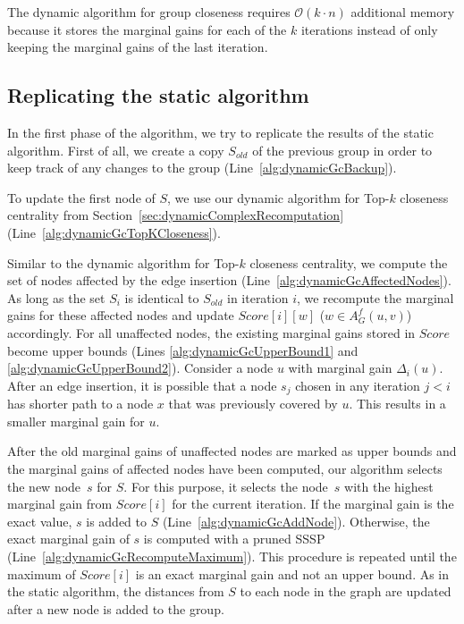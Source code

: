 The dynamic algorithm for group closeness requires $\mathcal{O}(k \cdot n)$ additional memory because it stores the marginal gains for each of the $k$ iterations instead of only keeping the marginal gains of the last iteration.

\subsection{Replicating the static algorithm}
In the first phase of the algorithm, we try to replicate the results of the static algorithm. First of all, we create a copy $S_{old}$ of the previous group in order to keep track of any changes to the group (Line~\ref{alg:dynamicGcBackup}).

To update the first node of $S$, we use our dynamic algorithm for Top-$k$ closeness centrality from Section~\ref{sec:dynamicComplexRecomputation} (Line~\ref{alg:dynamicGcTopKCloseness}). 

Similar to the dynamic algorithm for Top-$k$ closeness centrality, we compute the set of nodes affected by the edge insertion (Line~\ref{alg:dynamicGcAffectedNodes}). As long as the set $S_i$ is identical to $S_{old}$ in iteration $i$, we recompute the marginal gains for these affected nodes and update $Score[i][w]$ ($w \in A_G^f(u, v)$) accordingly. For all unaffected nodes, the existing marginal gains stored in $Score$ become upper bounds (Lines \ref{alg:dynamicGcUpperBound1} and \ref{alg:dynamicGcUpperBound2}). Consider a node $u$ with marginal gain $\Delta_i(u)$. After an edge insertion, it is possible that a node $s_j$ chosen in any iteration $j < i$ has shorter path to a node $x$ that was previously covered by $u$. This results in a smaller marginal gain for $u$.

After the old marginal gains of unaffected nodes are marked as upper bounds and the marginal gains of affected nodes have been computed, our algorithm selects the new node~$s$ for $S$. For this purpose, it selects the node~$s$ with the highest marginal gain from $Score[i]$ for the current iteration. If the marginal gain is the exact value, $s$ is added to $S$ (Line~\ref{alg:dynamicGcAddNode}). Otherwise, the exact marginal gain of $s$ is computed with a pruned SSSP (Line~\ref{alg:dynamicGcRecomputeMaximum}). This procedure is repeated until the maximum of $Score[i]$ is an exact marginal gain and not an upper bound. As in the static algorithm, the distances from $S$ to each node in the graph are updated after a new node is added to the group.

